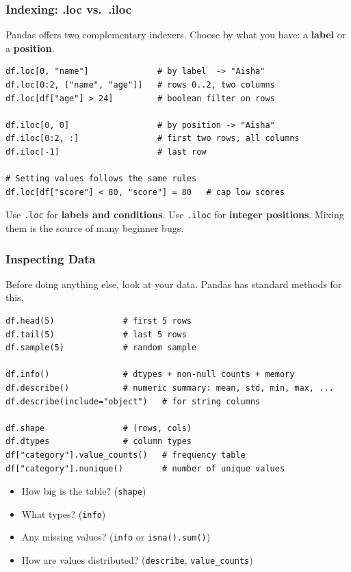 \documentclass[aspectratio=169,10pt]{beamer}
\newcommand{\keyword}[1]{\textcolor{PrimaryBlue}{\textbf{#1}}}
\newcommand{\codeword}[1]{\texttt{#1}}
\newenvironment{bluebox}[1]{%
  \vspace{0.08cm}\begin{tcolorbox}[lecturebox,title={#1},fontupper=\small]%
}{\end{tcolorbox}\vspace{0.05cm}}
\begin{document}
\begin{frame}[fragile]
\frametitle{Indexing: .loc vs.\ .iloc}
\small
Pandas offers two complementary indexers. Choose by what you have: a \keyword{label} or a \keyword{position}.

\vspace{0.12cm}
\begin{lstlisting}[style=pycode]
df.loc[0, "name"]              # by label  -> "Aisha"
df.loc[0:2, ["name", "age"]]   # rows 0..2, two columns
df.loc[df["age"] > 24]         # boolean filter on rows

df.iloc[0, 0]                  # by position -> "Aisha"
df.iloc[0:2, :]                # first two rows, all columns
df.iloc[-1]                    # last row

# Setting values follows the same rules
df.loc[df["score"] < 80, "score"] = 80   # cap low scores
\end{lstlisting}

\begin{bluebox}{Rule of thumb}
Use \codeword{.loc} for \keyword{labels and conditions}. Use \codeword{.iloc} for \keyword{integer positions}. Mixing them is the source of many beginner bugs.
\end{bluebox}
\end{frame}


\begin{frame}[fragile]
\frametitle{Inspecting Data}
\small
Before doing anything else, look at your data. Pandas has standard methods for this.

\vspace{0.12cm}
\begin{lstlisting}[style=pycode]
df.head(5)              # first 5 rows
df.tail(5)              # last 5 rows
df.sample(5)            # random sample

df.info()               # dtypes + non-null counts + memory
df.describe()           # numeric summary: mean, std, min, max, ...
df.describe(include="object")   # for string columns

df.shape                # (rows, cols)
df.dtypes               # column types
df["category"].value_counts()   # frequency table
df["category"].nunique()        # number of unique values
\end{lstlisting}

\begin{tcolorbox}[lecturebox,title=First-look checklist]
\begin{itemize}\setlength\itemsep{0.04cm}
  \item How big is the table? (\codeword{shape})
  \item What types? (\codeword{info})
  \item Any missing values? (\codeword{info} or \codeword{isna().sum()})
  \item How are values distributed? (\codeword{describe}, \codeword{value\_counts})
\end{itemize}
\end{tcolorbox}
\end{frame}
\end{document}
